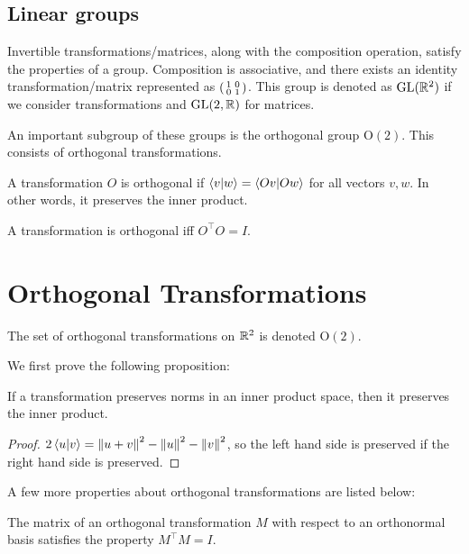\subsection{Linear groups}

Invertible transformations/matrices, along with the composition operation, satisfy the properties of a group. Composition is associative, and there exists an identity transformation/matrix represented as $\smqty(1 & 0 \\ 0 & 1)$. This group is denoted as $\mathrm{GL}(\mathbb R^2)$ if we consider transformations and $\mathrm{GL}(2, \mathbb R)$ for matrices.

An important subgroup of these groups is the orthogonal group $\mathrm O(2)$. This consists of orthogonal transformations.

\begin{definition}
    A transformation $O$ is orthogonal if $\braket{v}{w} = \braket{Ov}{Ow}$ for all vectors $v, w$. In other words, it preserves the inner product.
\end{definition}

\begin{proposition}
    A transformation is orthogonal iff $O^\top O = I$.
\end{proposition}

\section{Orthogonal Transformations}

The set of orthogonal transformations on $\mathbb R^2$ is denoted $\mathrm O(2)$.

We first prove the following proposition:

\begin{proposition}
    If a transformation preserves norms in an inner product space, then it preserves the inner product.
\end{proposition}

\begin{proof}
    $2\braket{u}{v} = \norm{u + v}^2 - \norm{u}^2 - \norm{v}^2$, so the left hand side is preserved if the right hand side is preserved.
\end{proof}

A few more properties about orthogonal transformations are listed below:
\begin{proposition}
    The matrix of an orthogonal transformation $M$ with respect to an orthonormal basis satisfies the property $M^\top M = I$.
\end{proposition}

